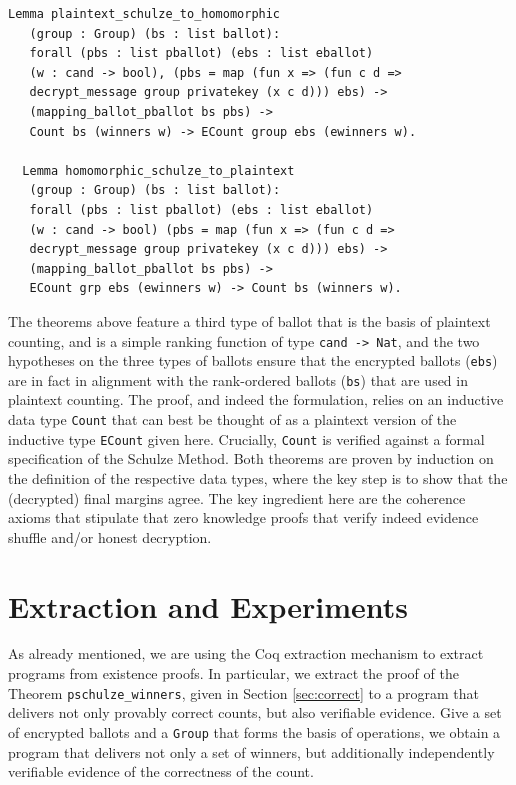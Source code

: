 \documentclass{llncs}
\begin{document}
\begin{lstlisting}[frame=single,basicstyle=\ttfamily\footnotesize]
  Lemma plaintext_schulze_to_homomorphic 
   (group : Group) (bs : list ballot): 
   forall (pbs : list pballot) (ebs : list eballot) 
   (w : cand -> bool), (pbs = map (fun x => (fun c d => 
   decrypt_message group privatekey (x c d))) ebs) ->
   (mapping_ballot_pballot bs pbs) -> 
   Count bs (winners w) -> ECount group ebs (ewinners w).
      
  Lemma homomorphic_schulze_to_plaintext 
   (group : Group) (bs : list ballot):
   forall (pbs : list pballot) (ebs : list eballot) 
   (w : cand -> bool) (pbs = map (fun x => (fun c d => 
   decrypt_message group privatekey (x c d))) ebs) ->
   (mapping_ballot_pballot bs pbs) ->
   ECount grp ebs (ewinners w) -> Count bs (winners w).
\end{lstlisting}

\noindent
The theorems above feature a third type of ballot that is the basis
of plaintext counting, and is a simple ranking function of type
\texttt{cand -> Nat}, and the two hypotheses on the three types of
ballots ensure that the encrypted ballots (\texttt{ebs}) are in fact
in alignment with the rank-ordered ballots (\texttt{bs}) that are
used in plaintext counting. 
The proof, and indeed the formulation, relies on an inductive data
type \texttt{Count} that can best be thought of as a plaintext
version of the inductive type  \texttt{ECount} given here.
Crucially, \texttt{Count} is verified against a formal specification
of the Schulze Method. Both theorems are proven by induction on the
definition of the respective data types, where the key step is to
show that the (decrypted) final margins agree. The key ingredient
here are the coherence axioms that stipulate that zero knowledge
proofs that verify indeed evidence shuffle and/or honest decryption.



\section{Extraction and Experiments} \label{sec:extract}

As already mentioned, we are using  the Coq extraction
mechanism\cite{Letouzey:2003:NEC}  to extract programs from
existence proofs. In particular, we extract the proof of the Theorem
\texttt{pschulze\_winners}, given in Section \ref{sec:correct} to a
program that delivers not only provably correct counts, but also
verifiable evidence.  Give a set of encrypted ballots and a \texttt{Group}
that forms the basis of operations, we obtain a program that
delivers not only a set of winners, but additionally independently  verifiable
evidence of the correctness of the count. 
\end{document}
